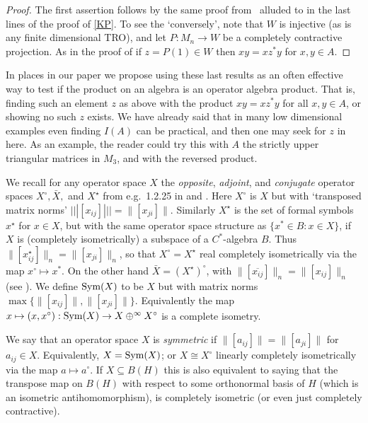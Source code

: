 \documentclass{amsart}
\theoremstyle{remark}
\theoremstyle{definition}
\numberwithin{equation}{section}
\begin{document}
\begin{proof}  The first assertion follows by the same
proof from~\cite{BRS} alluded to in the last lines of the proof
of  \ref{KP}.  To see the `conversely',  note that 
$W$ is injective (as is any finite dimensional TRO), and let $P : M_n \to W$ be a completely contractive projection.  As in the 
proof of  \cite[Theorem 5.2]{BNm2} if $z = P(1) \in W$ then $xy = x z^* y$ for $x, y \in A$. \end{proof}
        
      In places in our paper we propose using  these last results
       as an often  effective way to test if the product on        an algebra is an  operator algebra product.
       That is, finding such an element $z$ as above with the product $xy = xz^*y$ for all $x,y \in A$,
       or showing no such $z$ exists.
       We have already said that in many low dimensional examples even finding $I(A)$ 
       can be  practical, and then one may seek for $z$ in here.  As an example, the reader could 
       try this with $A$ the strictly upper triangular matrices in $M_3$, and with the reversed product. 

  We recall for any operator space $X$ the {\em opposite}, {\em adjoint}, and {\em conjugate} operator spaces $X^\circ, \bar{X},$ and $X^\star$ from e.g.\ 1.2.25 in \cite{BLM} and \cite{P}.  
Here $X^\circ$ is $X$ but with `transposed matrix norms' $|||[x_{ij} ]||| = \| [x_{ji} ] \|$.
Similarly $X^\star$ is the set of formal symbols $x^\star$ for $x \in X$, but with  the same operator space structure 
as  $\{ x^* \in B : x \in X \}$, if $X$ is (completely isometrically) a subspace of a 
$C^*$-algebra $B$.   Thus $\| [x_{ij}^\star] \|_n = \| [x_{ji} ] \|_n$, so that $X^\circ = X^\star$ real completely isometrically via the map $x^\circ \mapsto x^*$. 
On the other hand $\bar{X} = (X^{\star})^\circ$, with $\| [\overline{x_{ij}}] \|_n = \| [x_{ij}] \|_n$ (see \cite[Section 5]{BReal}). 
We define  ${\rm Sym}(X)$ to be $X$ but with
matrix norms $\max \{ \| [x_{ij} ] \| , \| [x_{ji} ] \| \}$.  Equivalently the map $x \mapsto (x,x^{\circ}) : {\rm Sym}(X) \to X \oplus^\infty X^{\circ}$ is a complete isometry.

We say that an operator space  $X$ is {\em symmetric} 
if  $\| [a_{ij} ] \| = \| [a_{ji}] \|$ for $a_{ij} \in X$.   Equivalently, $X = {\rm Sym}(X)$; or $X \cong X^{\circ}$ linearly completely isometrically via the map $a \mapsto a^\circ$.   If $X \subseteq B(H)$ this is also equivalent to saying that the transpose map on $B(H)$  with respect to some orthonormal basis of $H$ 
 (which is an isometric antihomomorphism), is 
 completely isometric (or even just completely contractive).
 
\end{document}
